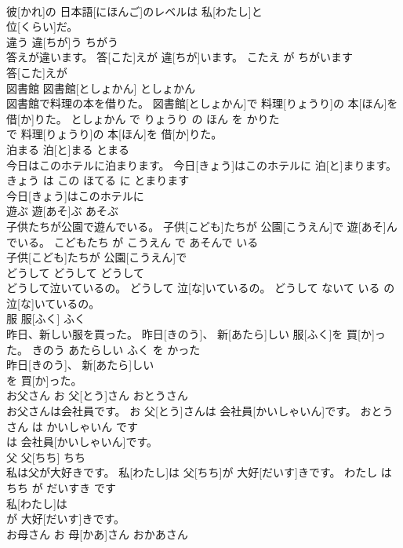 \documentclass[8pt]{extreport}
\begin{document}
\begin{CJK}{UTF8}{min}
\\	彼[かれ]の 日本語[にほんご]のレベルは 私[わたし]と
\\	位[くらい]だ。		
\\	違う	違[ちが]う	ちがう	
\\	答えが違います。	答[こた]えが 違[ちが]います。	こたえ が ちがいます	
\\	答[こた]えが
\\	図書館	図書館[としょかん]	としょかん	
\\	図書館で料理の本を借りた。	図書館[としょかん]で 料理[りょうり]の 本[ほん]を 借[か]りた。	としょかん で りょうり の ほん を かりた	
\\	で 料理[りょうり]の 本[ほん]を 借[か]りた。		
\\	泊まる	泊[と]まる	とまる	
\\	今日はこのホテルに泊まります。	今日[きょう]はこのホテルに 泊[と]まります。	きょう は この ほてる に とまります	
\\	今日[きょう]はこのホテルに
\\	遊ぶ	遊[あそ]ぶ	あそぶ	
\\	子供たちが公園で遊んでいる。	子供[こども]たちが 公園[こうえん]で 遊[あそ]んでいる。	こどもたち が こうえん で あそんで いる	
\\	子供[こども]たちが 公園[こうえん]で
\\	どうして	どうして	どうして	
\\	どうして泣いているの。	どうして 泣[な]いているの。	どうして ないて いる の	
\\	泣[な]いているの。		
\\	服	服[ふく]	ふく	
\\	昨日、新しい服を買った。	昨日[きのう]、 新[あたら]しい 服[ふく]を 買[か]った。	きのう あたらしい ふく を かった	
\\	昨日[きのう]、 新[あたら]しい
\\	を 買[か]った。		
\\	お父さん	お 父[とう]さん	おとうさん	
\\	お父さんは会社員です。	お 父[とう]さんは 会社員[かいしゃいん]です。	おとうさん は かいしゃいん です	
\\	は 会社員[かいしゃいん]です。		
\\	父	父[ちち]	ちち	
\\	私は父が大好きです。	私[わたし]は 父[ちち]が 大好[だいす]きです。	わたし は ちち が だいすき です	
\\	私[わたし]は
\\	が 大好[だいす]きです。		
\\	お母さん	お 母[かあ]さん	おかあさん	

\end{CJK}
\end{document}
